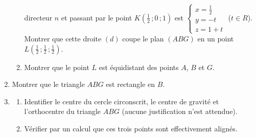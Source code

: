 \documentclass[a4paper,10pt]{article}
\newcommand{\R}{\mathbb{R}}
\newcommand{\N}{\mathbb{N}}
\newcommand{\Z}{\mathbb{Z}}
\newcommand{\Q}{\mathbb{Q}}
\newcommand{\vect}[1]{\overrightarrow{#1}}
\newcommand{\fois}[1]{\times{\color{coulExo}#1}}
\providecommand{\Cf}{\mathcal{C}\sb{f}}%
\providecommand{\Cg}{\mathcal{C}\sb{g}}%
\def\R{R}\def\N{N}\def\Z{Z}\def\Q{Q}\def\vect#1{#1}\def\Cf{Cf}\def\Cg{Cg}\def\fois#1{×#1}%
\begin{document}
\begin{multicols}{2}
\begin{enumerate}
\begin{enumerate}[label=\alph*)]
          directeur $\vect{n}$ et passant par le point $K\left(\frac{1}{2}\,;0\,;1\right)$
          est $\left\{\begin{array}{l} x=\frac{1}{2}\\ y=-t\\ z=1+t\end{array}\right.$
          ($t\in\R$). Montrer que cette droite $(d)$ coupe le plan $(ABG)$ en un point
          $L\left(\frac{1}{2}\,;\frac{1}{2}\,;\frac{1}{2}\right)$.
    \item Montrer que le point $L$ est équidistant des points $A$, $B$ et $G$.
  \end{enumerate}
  \item Montrer que le triangle $ABG$ est rectangle en $B$.
  \item
  \begin{enumerate}[label=\alph*)]
    \item Identifier le centre du cercle circonscrit, le centre de gravité et
          l'orthocentre du triangle $ABG$ (aucune justification n'est attendue).
    \item Vérifier par un calcul que ces trois points sont effectivement alignés.
  \end{enumerate}
\end{enumerate}

\end{multicols}
\end{document}
